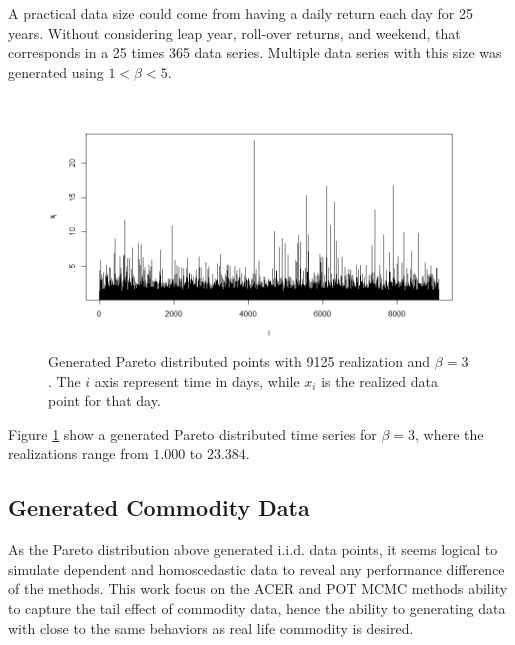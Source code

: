 A practical data size could come from having a daily return each day for 25 years. Without considering leap year, roll-over returns, and weekend, that corresponds in a 25 times 365 data series. Multiple data series with this size was generated using $1<\beta<5$.
\begin{figure}
  \centering
    \includegraphics[width=1\textwidth]{fig/paretoreala.png}
  \caption{Generated Pareto distributed points with 9125 realization and $\beta=3$. The $i$ axis represent time in days, while $x_i$ is the realized data point for that day.}
  \label{fig:paretodata}
\end{figure}
Figure \ref{fig:paretodata} show a generated Pareto distributed time series for $\beta=3$, where the realizations range from $1.000$ to $23.384$.

\subsection{Generated Commodity Data}
As the Pareto distribution above generated i.i.d. data points, it seems logical to simulate dependent and homoscedastic data to reveal any performance difference of the methods. This work focus on the ACER and POT MCMC methods ability to capture the tail effect of commodity data, hence the ability to generating data with close to the same behaviors as real life commodity is desired. 

